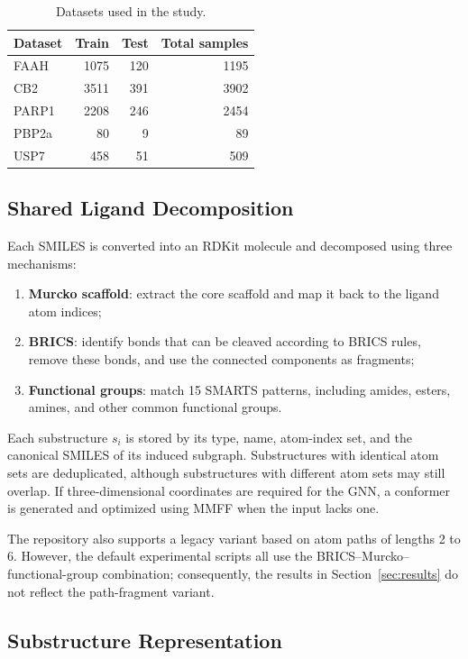 \begin{table}[htbp]
    \centering
    \caption{Datasets used in the study.}
    \label{tab:datasets}
    \begin{tabular}{lrrr}
        \hline
        Dataset & Train & Test & Total samples \\
        \hline
        FAAH   & 1075 & 120 & 1195 \\
        CB2    & 3511 & 391 & 3902 \\
        PARP1  & 2208 & 246 & 2454 \\
        PBP2a  & 80   & 9   & 89 \\
        USP7   & 458  & 51  & 509 \\
        \hline
    \end{tabular}
\end{table}

\subsection{Shared Ligand Decomposition}

Each SMILES is converted into an RDKit molecule and decomposed using three
mechanisms:
\begin{enumerate}
    \item \textbf{Murcko scaffold}: extract the core scaffold and map it back to
    the ligand atom indices;
    \item \textbf{BRICS}: identify bonds that can be cleaved according to BRICS
    rules, remove these bonds, and use the connected components as fragments;
    \item \textbf{Functional groups}: match 15 SMARTS patterns, including
    amides, esters, amines, and other common functional groups.
\end{enumerate}
Each substructure \(s_i\) is stored by its type, name, atom-index set, and the
canonical SMILES of its induced subgraph. Substructures with identical atom sets
are deduplicated, although substructures with different atom sets may still
overlap. If three-dimensional coordinates are required for the GNN, a conformer
is generated and optimized using MMFF when the input lacks one.

The repository also supports a legacy variant based on atom paths of lengths 2
to 6. However, the default experimental scripts all use the
BRICS--Murcko--functional-group combination; consequently, the results in
Section~\ref{sec:results} do not reflect the path-fragment variant.

\subsection{Substructure Representation}

